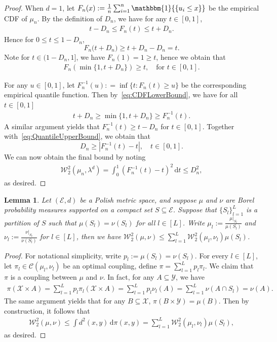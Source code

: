 \documentclass[11pt]{article}
\newtheorem{lemma}[thm]{Lemma}
\newcommand{\bone}{\mathbbm{1}}
\begin{document}
\begin{proof}
When $d = 1$, let $F_n(x): = \frac{1}{n}\sum_{i = 1}^n \bone{\{u_i \leq x\}}$ be the empirical CDF of $\mu_n$. By the definition of $D_n$, we have for any $t \in [0, 1]$,
\begin{align*}
  t - D_n \leq F_n(t) \leq t + D_n.
\end{align*}
Hence for $0 \leq t \leq 1- D_n$,
\[
F_n\bigl(t + D_n\bigr)  \geq  t +D_n - D_n = t.
\]
Note for $t \in (1- D_n, 1]$, we have $F_n(1) = 1 \geq t$, hence we obtain that 
\begin{align}
F_n(\min\{1, t +D_n\}) \geq t, \quad \text{for $t \in [0, 1]$}. \label{eq:CDFLowerBound}
\end{align}

For any $u \in [0, 1]$, let $F_n^{-1}(u) : = \inf \{t: F_n(t) \geq u\}$ be the corresponding empirical quantile function. Then by~\eqref{eq:CDFLowerBound}, we have for all $ t \in [0, 1]$
\begin{align}
    t + D_n\geq \min\{1, t + D_n\} \geq F_n^{-1}(t). \label{eq:QuantileUpperBound}
\end{align}
A similar argument yields that $F_n^{-1}(t) \geq t - D_n$ for $t \in [0, 1]$. Together with~\eqref{eq:QuantileUpperBound}, we obtain that
\[
D_n \geq |F_n^{-1}(t) - t|, \quad t \in [0, 1].
\]
We can now obtain the final bound by noting
\begin{align*}
\mathcal{W}_2^2(\mu_n, \lambda^d) = \int_{0}^1 (F_n^{-1}(t) - t)^2 \, \mathrm{d}t \leq D_n^2,
\end{align*}
as desired. 
\end{proof}

\begin{lemma}\label{lem:2-WassersteinPartitionBound}
Let $(\mathcal{E}, d)$ be a Polish metric space, and suppose $\mu$ and $\nu$ are Borel probability measures supported on a compact set $S \subseteq \mathcal{E}$. Suppose that $\{S_l\}_{l = 1}^L$ is a partition of $S$ such that $\mu(S_l) = \nu(S_l)$ for all $l \in [L]$. Write $\mu_l := \frac{\mu|_{S_l}}{\mu(S_l)}$ and $\nu_l := \frac{\nu|_{S_l}}{\nu(S_l)}$ for $l \in [L]$, then we have $\mathcal{W}_2^2(\mu, \nu) \leq \sum_{l = 1}^L \mathcal{W}_2^2(\mu_l, \nu_l) \mu(S_l)$.   
\end{lemma}
\begin{proof}
For notational simplicity, write $p_l := \mu(S_l) = \nu(S_l)$. For every $l \in [L]$, let $\pi_l \in \mathcal{C}(\mu_l, \nu_l)$ be an optimal coupling, define $\pi = \sum_{l = 1}^L p_l \pi_l$. We claim that $\pi$ is a coupling between $\mu$ and $\nu$. In fact, for any $A \subseteq \mathcal{Y}$, we have 
\begin{align*}
    \pi(\mathcal{X} \times A) = \sum_{l = 1}^L p_l \pi_l(\mathcal{X} \times A) =\sum_{l = 1}^L p_l \nu_l(A) = \sum_{l = 1}^L \nu(A \cap S_l) = \nu(A). 
\end{align*}
The same argument yields that for any $B \subseteq \mathcal{X}$, $\pi(B \times \mathcal{Y}) = \mu(B)$. Then by construction, it follows that
\begin{align*}
    \mathcal{W}_2^2(\mu, \nu) \leq \int d^2(x, y) \, \mathrm{d}\pi(x, y) = \sum_{l = 1}^L \mathcal{W}_2^2(\mu_l, \nu_l) \mu(S_l), 
\end{align*}
as desired. 
\end{proof}
\end{document}
